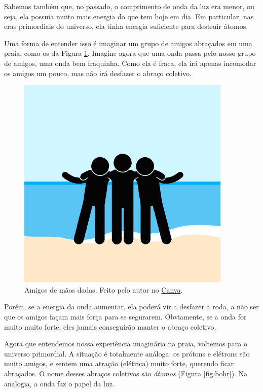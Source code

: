 \begin{multicols}{2}
Sabemos também que, no passado, o comprimento de onda da luz era menor, ou seja, ela possuía muito mais energia do que tem hoje em dia. Em particular, nas eras primordiais do universo, ela tinha energia suficiente para destruir átomos.

Uma forma de entender isso é imaginar um grupo de amigos abraçados em uma praia, como os da Figura \ref{fig:amigos}. Imagine agora que uma onda passa pelo nosso grupo de amigos, uma onda bem fraquinha. Como ela é fraca, ela irá apenas incomodar os amigos um pouco, mas não irá desfazer o abraço coletivo.

\begin{figure}[H]
	\centering
	\includegraphics[width=\linewidth]{Figuras/Artigo1/Beach.png}
	\caption{Amigos de mãos dadas. Feito pelo autor no \href{https://www.canva.com/}{Canva}.}
	\label{fig:amigos}
\end{figure}

Porém, se a energia da onda aumentar, ela poderá vir a desfazer a roda, a não ser que os amigos façam mais força para se segurarem. Obviamente, se a onda for muito muito forte, eles jamais conseguirão manter o abraço coletivo.

Agora que entendemos nossa experiência imaginária na praia, voltemos para o universo primordial. A situação é totalmente análoga: os prótons e elétrons são muito amigos, e sentem uma atração (elétrica) muito forte, querendo ficar abraçados. O nome desses abraços coletivos são \textit{átomos} (Figura \ref{fig:bohr}). Na analogia, a onda faz o papel da luz.


\end{multicols}
